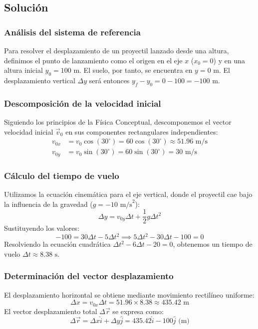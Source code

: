 \documentclass[12pt, a4paper]{article}
\begin{document}
\subsection*{Solución}

\subsubsection*{Análisis del sistema de referencia}
Para resolver el desplazamiento de un proyectil lanzado desde una altura, definimos el punto de lanzamiento como el origen en el eje $x$ ($x_0 = 0$) y en una altura inicial $y_0 = 100\text{ m}$. El suelo, por tanto, se encuentra en $y = 0\text{ m}$. El desplazamiento vertical $\Delta y$ será entonces $y_f - y_0 = 0 - 100 = -100\text{ m}$.

\subsubsection*{Descomposición de la velocidad inicial}
Siguiendo los principios de la Física Conceptual, descomponemos el vector velocidad inicial $\vec{v}_0$ en sus componentes rectangulares independientes:
\begin{align*}
v_{0x} &= v_0 \cos(30^{\circ}) = 60 \cos(30^{\circ}) \approx 51.96\text{ m/s} \\
v_{0y} &= v_0 \sin(30^{\circ}) = 60 \sin(30^{\circ}) = 30\text{ m/s}
\end{align*}

\subsubsection*{Cálculo del tiempo de vuelo}
Utilizamos la ecuación cinemática para el eje vertical, donde el proyectil cae bajo la influencia de la gravedad ($g = -10\text{ m/s}^2$):
\begin{equation*}
\Delta y = v_{0y} \Delta t + \frac{1}{2} g \Delta t^2
\end{equation*}
Sustituyendo los valores:
\begin{equation*}
-100 = 30 \Delta t - 5 \Delta t^2 \implies 5 \Delta t^2 - 30 \Delta t - 100 = 0
\end{equation*}
Resolviendo la ecuación cuadrática $\Delta t^2 - 6 \Delta t - 20 = 0$, obtenemos un tiempo de vuelo $\Delta t \approx 8.38\text{ s}$.

\subsubsection*{Determinación del vector desplazamiento}
El desplazamiento horizontal se obtiene mediante movimiento rectilíneo uniforme:
\begin{equation*}
\Delta x = v_{0x} \Delta t = 51.96 \times 8.38 \approx 435.42\text{ m}
\end{equation*}
El vector desplazamiento total $\Delta\vec{r}$ se expresa como:
\begin{equation*}
\Delta\vec{r} = \Delta x \hat{i} + \Delta y \hat{j} = 435.42 \hat{i} - 100 \hat{j} \text{ (m)}
\end{equation*}
\end{document}
